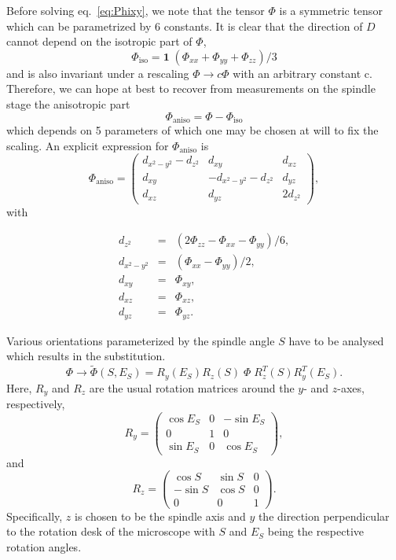 \documentclass{article}
\begin{document}
Before solving eq.\ \ref{eq:Phixy}, we note that the tensor $\Phi$ is a symmetric tensor which can be parametrized by 6 constants. 
It is clear that the direction of $D$ cannot depend on the isotropic part of $\Phi$, 
\[
	\Phi_\mathrm{iso}= \mathbf{1}\;(\Phi_{xx}+\Phi_{yy}+\Phi_{zz})/3
\]
 and is also invariant under a rescaling $\Phi \rightarrow c\Phi$ with an arbitrary constant c.
Therefore, we can hope at best to recover from measurements on the spindle stage the anisotropic part 
\[
	\Phi_\mathrm{aniso}=\Phi -\Phi_\mathrm{iso}
\] 
which depends on 5 parameters of which one may be chosen at will to fix the scaling. 
An explicit expression for $\Phi_\mathrm{aniso}$ is 
\[
    \Phi_\mathrm{aniso}=	\left(\begin{array}{ccc}
			d_{x^2-y^2}-d_{z^2} & d_{xy} & d_{xz}\\
			d_{xy} &-d_{x^2-y^2}-d_{z^2}&d_{yz}\\
			d_{xz}&d_{yz}& 2d_{z^2}
	\end{array}\right),
\]
with 

\begin{eqnarray*}
	d_{z^2}&=&(2\Phi_{zz}-\Phi_{xx}-\Phi_{yy})/6,\\
	d_{x^2-y^2}&=&(\Phi_{xx}-\Phi_{yy})/2,\\
	d_{xy}&=&\Phi_{xy},\\
	d_{xz}&=&\Phi_{xz},\\
	d_{yz}&=&\Phi_{yz}.
\end{eqnarray*}


Various orientations parameterized by the spindle angle $S$ have to be analysed 
which results in the substitution. 
\[
	\Phi\rightarrow \tilde{\Phi}(S, E_S)=R_y(E_S)R_z(S)\;\Phi \;R^T_z(S)R^T_y(E_S).
\]
Here, $R_y$ and $R_z$ are the usual rotation matrices around the $y$- and $z$-axes, respectively,
\[
R_y=\left( \begin{array}{ccc} \cos E_S &0 & -\sin E_S \\ 0 & 1 &0 \\ \sin E_S  & 0 & \cos E_S \end{array} \right), 
\] 
and 
\[
R_z=\left( \begin{array}{ccc}  \cos S & \sin S & 0 \\ -\sin S & \cos S & 0 \\ 0 & 0 & 1 \end{array} \right). 
\] 
Specifically, $z$ is chosen to be the spindle axis and $y$ the direction perpendicular to the rotation desk of the microscope with $S$ and $E_S$ being the respective rotation angles. 
\end{document}

